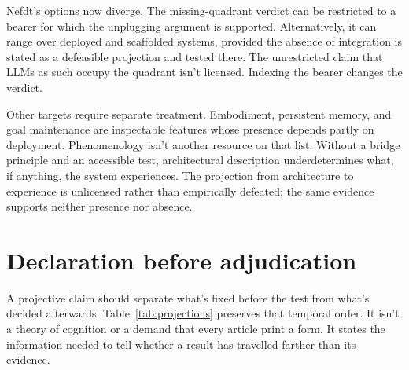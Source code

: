 \documentclass[12pt]{article}
\begin{document}
Nefdt's options now diverge. The missing-quadrant verdict can be restricted to a bearer for which the unplugging argument is supported. Alternatively, it can range over deployed and scaffolded systems, provided the absence of integration is stated as a defeasible projection and tested there. The unrestricted claim that LLMs as such occupy the quadrant isn't licensed. Indexing the bearer changes the verdict.

Other targets require separate treatment. Embodiment, persistent memory, and goal maintenance are inspectable features whose presence depends partly on deployment. Phenomenology isn't another resource on that list. Without a bridge principle and an accessible test, architectural description underdetermines what, if anything, the system experiences. The projection from architecture to experience is unlicensed rather than empirically defeated; the same evidence supports neither presence nor absence.

\section{Declaration before adjudication}

A projective claim should separate what's fixed before the test from what's decided afterwards. Table~\ref{tab:projections} preserves that temporal order. It isn't a theory of cognition or a demand that every article print a form. It states the information needed to tell whether a result has travelled farther than its evidence.
\end{document}
